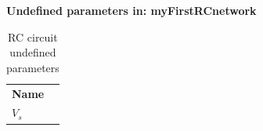 {\textbf{Undefined parameters in: myFirstRCnetwork}}

\begin{table}[h]
\centering
\begin{tabular}[c]{l}
\textbf{Name} \\ 
\rowcolor{myyellow}
$V_{s}$ \\ 
\end{tabular}
\caption{RC circuit undefined parameters}
\end{table}

